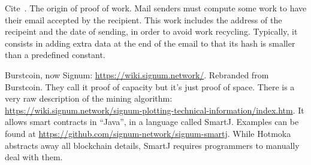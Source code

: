 Cite~\cite{DworkN92}. The origin of proof of work. Mail senders must compute some
work to have their email accepted by the recipient. This work includes
the address of the recipeint and the date of sending, in order to avoid
work recycling. Typically, it consists in adding extra data at the end of the email
to that its hash is smaller than a predefined constant.

Burstcoin, now Signum: \url{https://wiki.signum.network/}. Rebranded from Burstcoin.
They call it proof of capacity but it's just proof of space.
There is a very raw description of the mining algorithm:
\url{https://wiki.signum.network/signum-plotting-technical-information/index.htm}.
It allows smart contracts in ``Java'', in a language called SmartJ. Examples
can be found at \url{https://github.com/signum-network/signum-smartj}.
While Hotmoka abstracts away all blockchain details, SmartJ requires programmers to
manually deal with them.

